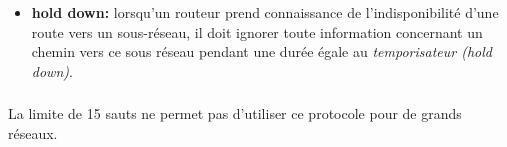 \documentclass[svgnames,11pt]{beamer}
\begin{document}
\begin{frame}
    \frametitle{}

    \begin{itemize}
        \item\textbf{hold down:} lorsqu'un routeur prend connaissance de l'indisponibilité d'une route vers un sous-réseau, il doit ignorer toute information concernant un chemin vers ce sous réseau pendant une durée égale au \emph{temporisateur (hold down)}.
    \end{itemize}
\end{frame}
\begin{frame}
    \frametitle{}

    \begin{aretenir}[Remarque]
        La limite de 15 sauts ne permet pas d'utiliser ce protocole pour de grands réseaux.
    \end{aretenir}

\end{frame}
\end{document}
